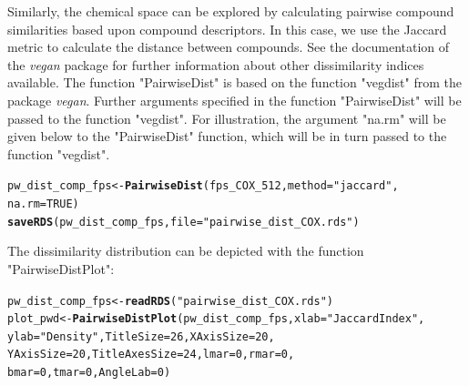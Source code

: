 \documentclass[twoside,a4wide,12pt]{article}\usepackage[]{graphicx}\usepackage[]{color}
\makeatletter
\newcommand{\hlnum}[1]{\textcolor[rgb]{0.686,0.059,0.569}{#1}}%
\newcommand{\hlstr}[1]{\textcolor[rgb]{0.192,0.494,0.8}{#1}}%
\newcommand{\hlstd}[1]{\textcolor[rgb]{0.345,0.345,0.345}{#1}}%
\newcommand{\hlkwb}[1]{\textcolor[rgb]{0.69,0.353,0.396}{#1}}%
\newcommand{\hlkwc}[1]{\textcolor[rgb]{0.333,0.667,0.333}{#1}}%
\newcommand{\hlkwd}[1]{\textcolor[rgb]{0.737,0.353,0.396}{\textbf{#1}}}%
\newenvironment{kframe}{%
 \def\at@end@of@kframe{}%
 \ifinner\ifhmode%
  \def\at@end@of@kframe{\end{minipage}}%
  \begin{minipage}{\columnwidth}%
 \fi\fi%
 \def\FrameCommand##1{\hskip\@totalleftmargin \hskip-\fboxsep
 \colorbox{shadecolor}{##1}\hskip-\fboxsep
     \hskip-\linewidth \hskip-\@totalleftmargin \hskip\columnwidth}%
 \MakeFramed {\advance\hsize-\width
   \@totalleftmargin\z@ \linewidth\hsize
   \@setminipage}}%
 {\par\unskip\endMakeFramed%
 \at@end@of@kframe}
\newenvironment{knitrout}{}{} %
\makeatother
\begin{document}
Similarly, the chemical space can be explored by calculating pairwise compound similarities based upon compound descriptors. 
In this case, we use the Jaccard metric to calculate the distance between compounds.
See the documentation of the {\it vegan} package for further information about other dissimilarity indices available.
The function "PairwiseDist" is based on the function "vegdist" from the package {\it vegan}.
Further arguments specified in the function "PairwiseDist" will be passed to the function "vegdist". 
For illustration, the argument "na.rm" will be given below to the "PairwiseDist" function, which will be in turn
passed to the function "vegdist".
\begin{knitrout}
\color{fgcolor}\begin{kframe}
\begin{alltt}
\hlstd{pw_dist_comp_fps} \hlkwb{<-} \hlkwd{PairwiseDist}\hlstd{(fps_COX_512,} \hlkwc{method} \hlstd{=} \hlstr{"jaccard"}\hlstd{,}
    \hlkwc{na.rm} \hlstd{=} \hlnum{TRUE}\hlstd{)}
\hlkwd{saveRDS}\hlstd{(pw_dist_comp_fps,} \hlkwc{file} \hlstd{=} \hlstr{"pairwise_dist_COX.rds"}\hlstd{)}
\end{alltt}
\end{kframe}
\end{knitrout}
The dissimilarity distribution can be depicted with the function "PairwiseDistPlot": 
\begin{knitrout}
\color{fgcolor}\begin{kframe}
\begin{alltt}
\hlstd{pw_dist_comp_fps} \hlkwb{<-} \hlkwd{readRDS}\hlstd{(}\hlstr{"pairwise_dist_COX.rds"}\hlstd{)}
\hlstd{plot_pwd} \hlkwb{<-} \hlkwd{PairwiseDistPlot}\hlstd{(pw_dist_comp_fps,} \hlkwc{xlab} \hlstd{=} \hlstr{"Jaccard Index"}\hlstd{,}
    \hlkwc{ylab} \hlstd{=} \hlstr{"Density"}\hlstd{,} \hlkwc{TitleSize} \hlstd{=} \hlnum{26}\hlstd{,} \hlkwc{XAxisSize} \hlstd{=} \hlnum{20}\hlstd{,}
    \hlkwc{YAxisSize} \hlstd{=} \hlnum{20}\hlstd{,} \hlkwc{TitleAxesSize} \hlstd{=} \hlnum{24}\hlstd{,} \hlkwc{lmar} \hlstd{=} \hlnum{0}\hlstd{,} \hlkwc{rmar} \hlstd{=} \hlnum{0}\hlstd{,}
    \hlkwc{bmar} \hlstd{=} \hlnum{0}\hlstd{,} \hlkwc{tmar} \hlstd{=} \hlnum{0}\hlstd{,} \hlkwc{AngleLab} \hlstd{=} \hlnum{0}\hlstd{)}
\end{alltt}
\end{kframe}
\end{knitrout}
\end{document}
